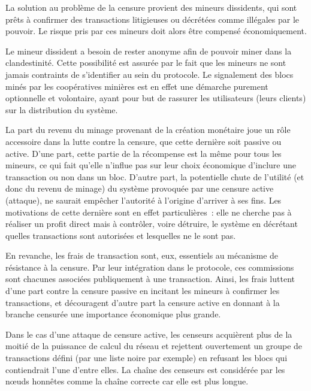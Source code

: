 La solution au problème de la censure provient des mineurs dissidents, qui sont prêts à confirmer des transactions litigieuses ou décrétées comme illégales par le pouvoir. Le risque pris par ces mineurs doit alors être compensé économiquement.

Le mineur dissident a besoin de rester anonyme afin de pouvoir miner dans la clandestinité. Cette possibilité est assurée par le fait que les mineurs ne sont jamais contraints de s'identifier au sein du protocole. Le signalement des blocs minés par les coopératives minières est en effet une démarche purement optionnelle et volontaire, ayant pour but de rassurer les utilisateurs (leurs clients) sur la distribution du système.

La part du revenu du minage provenant de la création monétaire joue un rôle accessoire dans la lutte contre la censure, que cette dernière soit passive ou active. D'une part, cette partie de la récompense est la même pour tous les mineurs, ce qui fait qu'elle n'influe pas sur leur choix économique d'inclure une transaction ou non dans un bloc. D'autre part, la potentielle chute de l'utilité (et donc du revenu de minage) du système provoquée par une censure active (attaque), ne saurait empêcher l'autorité à l'origine d'arriver à ses fins. Les motivations de cette dernière sont en effet particulières~: elle ne cherche pas à réaliser un profit direct mais à contrôler, voire détruire, le système en décrétant quelles transactions sont autorisées et lesquelles ne le sont pas.

En revanche, les frais de transaction sont, eux, essentiels au mécanisme de résistance à la censure. Par leur intégration dans le protocole, ces commissions sont chacunes associées publiquement à une transaction. Ainsi, les frais luttent d'une part contre la censure passive en incitant les mineurs à confirmer les transactions, et découragent d'autre part la censure active en donnant à la branche censurée une importance économique plus grande.


Dans le cas d'une attaque de censure active, les censeurs acquièrent plus de la moitié de la puissance de calcul du réseau et rejettent ouvertement un groupe de transactions défini (par une liste noire par exemple) en refusant les blocs qui contiendrait l'une d'entre elles. La chaîne des censeurs est considérée par les nœuds honnêtes comme la chaîne correcte car elle est plus longue.

